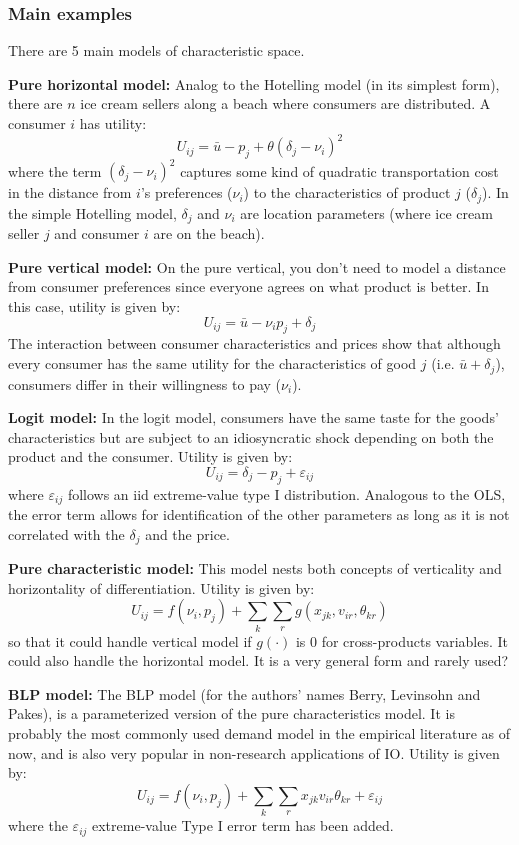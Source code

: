 \subsubsection{Main examples}

There are 5 main models of characteristic space.

\textbf{Pure horizontal model:} Analog to the Hotelling model (in its simplest form), there are $n$ ice cream sellers along a beach where consumers are distributed. A consumer $i$ has utility: $$U_{ij} = \bar u - p_j + \theta(\delta_j - \nu_i)^2 $$ where the term $(\delta_j - \nu_i)^2$ captures some kind of quadratic transportation cost in the distance from $i$'s preferences ($\nu_i$) to the characteristics of product $j$ ($\delta_j$). In the simple Hotelling model, $\delta_j$ and $\nu_i$ are location parameters (where ice cream seller $j$ and consumer $i$ are on the beach).

\textbf{Pure vertical model:} On the pure vertical, you don't need to model a distance from consumer preferences since everyone agrees on what product is better. In this case, utility is given by: $$ U_{ij} = \bar u - \nu_ip_j + \delta_j $$ The interaction between consumer characteristics and prices show that although every consumer has the same utility for the characteristics of good $j$ (i.e. $\bar u + \delta_j$), consumers differ in their willingness to pay ($\nu_i$).

\textbf{Logit model:} In the logit model, consumers have the same taste for the goods' characteristics but are subject to an idiosyncratic shock depending on both the product and the consumer. Utility is given by: $$U_{ij} = \delta_j - p_j + \varepsilon_{ij} $$ where $\varepsilon_{ij}$ follows an iid extreme-value type I distribution. Analogous to the OLS, the error term allows for identification of the other parameters as long as it is not correlated with the $\delta_j$ and the price.

\textbf{Pure characteristic model:} This model nests both concepts of verticality and horizontality of differentiation. Utility is given by: $$ U_{ij} = f(\nu_i, p_j) + \sum_{k}\sum_{r} g(x_{jk}, v_{ir}, \theta_{kr}) $$ so that it could handle vertical model if $g(\cdot)$ is 0 for cross-products variables. It could also handle the horizontal model. It is a very general form and rarely used?

\textbf{BLP model:} The BLP model (for the authors' names Berry, Levinsohn and Pakes), is a parameterized version of the pure characteristics model. It is probably the most commonly used demand model in the empirical literature as of now, and is also very popular in non-research applications of IO. Utility is given by: $$ U_{ij} = f(\nu_i, p_j) + \sum_{k}\sum_{r} x_{jk}v_{ir}\theta_{kr} + \varepsilon_{ij} $$ where the $\varepsilon_{ij}$ extreme-value Type I error term has been added.

